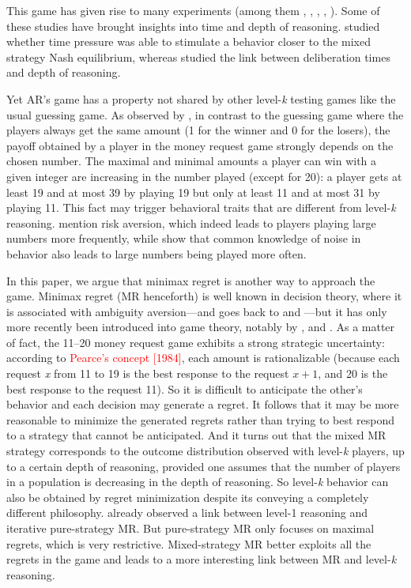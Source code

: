 \begin{Article}
\begin{refsection}[Umbhauer]
This game has given rise to many experiments (among them \textcite{arad2012}, \textcite{lindner2013}, \textcite{goeree2018}, \textcite{li2018}, \textcite{alosferrer2021}). Some of these studies have brought insights into time and depth of reasoning. \textcite{lindner2013} studied whether time pressure was able to stimulate a behavior closer to the mixed strategy Nash equilibrium, whereas \textcite{alosferrer2021} studied the link between deliberation times and depth of reasoning.

Yet AR's game has a property not shared by other level-\emph{k} testing
games like the usual guessing game. As observed by \textcite{li2018}, in contrast to the guessing game where the players always
get the same amount (1 for the winner and 0 for the losers), the payoff
obtained by a player in the money request game strongly depends on the
chosen number. The maximal and minimal amounts a player can win with a
given integer are increasing in the number played (except for 20): a
player gets at least 19 and at most 39 by playing 19 but only at least
11 and at most 31 by playing 11. This fact may trigger behavioral traits
that are different from level-\emph{k} reasoning. \textcite{li2018}
mention risk aversion, which indeed leads to players playing large
numbers more frequently, while \textcite{goeree2018} show that common
knowledge of noise in behavior also leads to large numbers being played
more often.

In this paper, we argue that minimax regret is another way to approach
the game. Minimax regret (MR henceforth) is well known in decision
theory, where it is associated with ambiguity aversion---and goes back
to \textcite{savage1951} and \textcite{niehans1948}---but it has only more
recently been introduced into game theory, notably by \textcite{linhart1989}, \textcite{renou2010} and \textcite{halpern2012}. As a matter of fact, the 11--20 money request game exhibits a strong strategic uncertainty: according to \textcolor{red}{Pearce's concept [1984]}, each amount is rationalizable (because each request \emph{x}
from 11 to 19 is the best response to the request \(x + 1\), and 20 is
the best response to the request 11). So it is difficult to anticipate
the other's behavior and each decision may generate a regret. It follows
that it may be more reasonable to minimize the generated regrets rather
than trying to best respond to a strategy that cannot be anticipated.
And it turns out that the mixed MR strategy corresponds to the outcome
distribution observed with level-\emph{k} players, up to a certain depth
of reasoning, provided one assumes that the number of players in a
population is decreasing in the depth of reasoning. So level-\emph{k}
behavior can also be obtained by regret minimization despite its
conveying a completely different philosophy. \textcite{garciapola2020} already observed a link between level-1 reasoning and iterative pure-strategy MR. But pure-strategy MR only focuses on maximal regrets, which is very restrictive. Mixed-strategy MR better exploits all the regrets in the game and leads to a more interesting link between MR and level-\emph{k} reasoning.


\end{refsection}
\end{Article}
